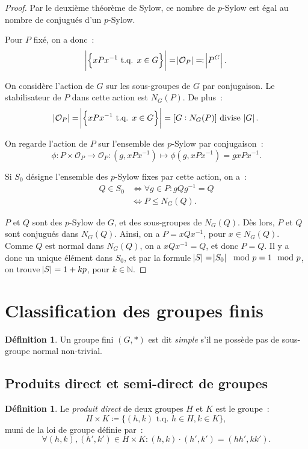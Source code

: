 \documentclass{article}
\theoremstyle{definition}
\newtheorem{déf}[thm]{Définition}
\theoremstyle{remark}
\newcommand{\N}{\mathbb N}
\newcommand{\tq}{\text{ t.q. }}
\begin{document}
	\begin{proof} Par le deuxième théorème de Sylow, ce nombre de $p$-Sylow est égal au nombre de conjugués d'un $p$-Sylow.

	Pour $P$ fixé, on a donc~:
	\[\abs {\left\{xPx^{-1} \tq x \in G\right\}} = \abs {\mathcal O_P} \eqqcolon \abs {P^G}.\]

	On considère l'action de $G$ sur les sous-groupes de $G$ par conjugaison. Le stabilisateur de $P$ dans cette action est $N_G(P)$.
	De plus~:
	\[\abs {\mathcal O_P} = \abs {\left\{xPx^{-1} \tq x \in G\right\}} = [G:N_G(P)] \text{ divise } \abs G.\]

	On regarde l'action de $P$ sur l'ensemble des $p$-Sylow par conjugaison~:
	\[\phi : P \times \mathcal O_P \to \mathcal O_P : (g, xPx^{-1}) \mapsto \phi(g, xPx^{-1}) = gxPx^{-1}.\]

	Si $S_0$ désigne l'ensemble des $p$-Sylow fixes par cette action, on a~:
	\begin{align*}
		Q \in S_0 &\iff \forall g \in P : gQg^{-1} = Q \\
		&\iff P \leq N_G(Q).
	\end{align*}

	$P$ et $Q$ sont des $p$-Sylow de $G$, et des sous-groupes de $N_G(Q)$. Dès lors, $P$ et $Q$ sont conjugués dans $N_G(Q)$. Ainsi, on a
	$P = xQx^{-1}$, pour $x \in N_G(Q)$. Comme $Q$ est normal dans $N_G(Q)$, on a $xQx^{-1} = Q$, et donc $P=Q$. Il y a donc un unique élément dans $S_0$, et
	par la formule $\abs S = \abs {S_0} \mod p = 1 \mod p$, on trouve $\abs S = 1 + kp$, pour $k \in \N$.
	\end{proof}

\section{Classification des groupes finis}
	\begin{déf} Un groupe fini $(G, *)$ est dit \textit{simple} s'il ne possède pas de sous-groupe normal non-trivial.
	\end{déf}

	\subsection{Produits direct et semi-direct de groupes}
		\begin{déf} Le \textit{produit direct} de deux groupes $H$ et $K$ est le groupe~:
		\[H \times K \coloneqq \{(h, k) \tq h \in H, k \in K\},\]
		muni de la loi de groupe définie par~:
		\[\forall (h, k), (h', k') \in H \times K : (h, k) \cdot (h', k') = (hh', kk').\]
		\end{déf}
\end{document}
